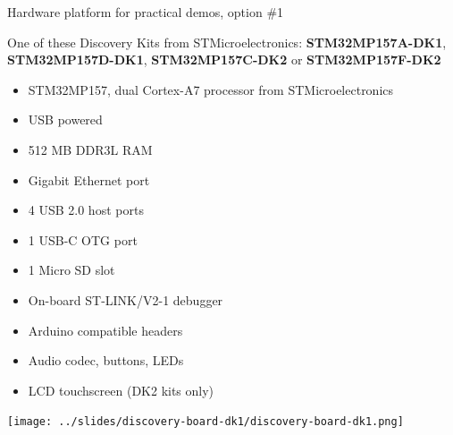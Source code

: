 \documentclass[a4paper,12pt,obeyspaces,spaces,hyphens]{article}
\begin{document}
\certificate{}
\disabilities{}

\feagendatwocolumn
{Hardware platform for practical demos, option \#1}
{
  One of these Discovery Kits from STMicroelectronics: {\bf
  STM32MP157A-DK1}, {\bf STM32MP157D-DK1}, {\bf STM32MP157C-DK2} or
  {\bf STM32MP157F-DK2}
  \begin{itemize}
  \item STM32MP157, dual Cortex-A7 processor from STMicroelectronics
  \item USB powered
  \item 512 MB DDR3L RAM
  \item Gigabit Ethernet port
  \item 4 USB 2.0 host ports
  \item 1 USB-C OTG port
  \item 1 Micro SD slot
  \item On-board ST-LINK/V2-1 debugger
  \item Arduino compatible headers
  \item Audio codec, buttons, LEDs
  \item LCD touchscreen (DK2 kits only)
  \end{itemize}
}
{}
{
  \begin{center}
    \texttt{[image: ../slides/discovery-board-dk1/discovery-board-dk1.png]}
  \end{center}
}
\end{document}
